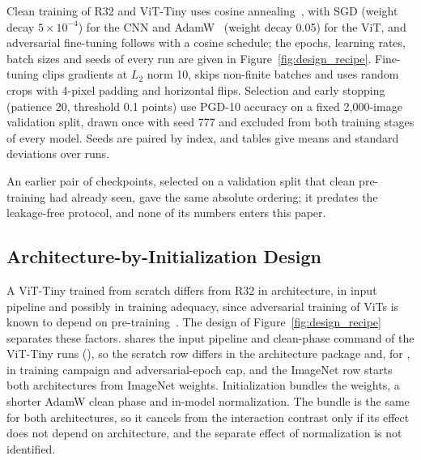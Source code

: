 Clean training of R32 and ViT-Tiny uses cosine annealing~\cite{loshchilov2016sgdr}, with SGD (weight decay $5\times10^{-4}$) for the CNN and AdamW~\cite{loshchilov2017decoupled} (weight decay 0.05) for the ViT, and adversarial fine-tuning follows with a cosine schedule; the epochs, learning rates, batch sizes and seeds of every run are given in Figure~\ref{fig:design_recipe}. Fine-tuning clips gradients at $L_2$ norm 10, skips non-finite batches and uses random crops with 4-pixel padding and horizontal flips. Selection and early stopping (patience 20, threshold 0.1 points) use PGD-10 accuracy on a fixed 2{,}000-image validation split, drawn once with seed 777 and excluded from both training stages of every model. Seeds are paired by index, and tables give means and standard deviations over runs.

An earlier pair of checkpoints, selected on a validation split that clean pre-training had already seen, gave the same absolute ordering; it predates the leakage-free protocol, and none of its numbers enters this paper.

\subsection{Architecture-by-Initialization Design}
\label{subsec:design}

A ViT-Tiny trained from scratch differs from R32 in architecture, in input pipeline and possibly in training adequacy, since adversarial training of ViTs is known to depend on pre-training~\cite{mo2022adversarial}. The design of Figure~\ref{fig:design_recipe} separates these factors.  shares the input pipeline and clean-phase command of the ViT-Tiny runs (), so the scratch row differs in the architecture package and, for , in training campaign and adversarial-epoch cap, and the ImageNet row starts both architectures from ImageNet weights. Initialization bundles the weights, a shorter AdamW clean phase and in-model normalization. The bundle is the same for both architectures, so it cancels from the interaction contrast only if its effect does not depend on architecture, and the separate effect of normalization is not identified.

